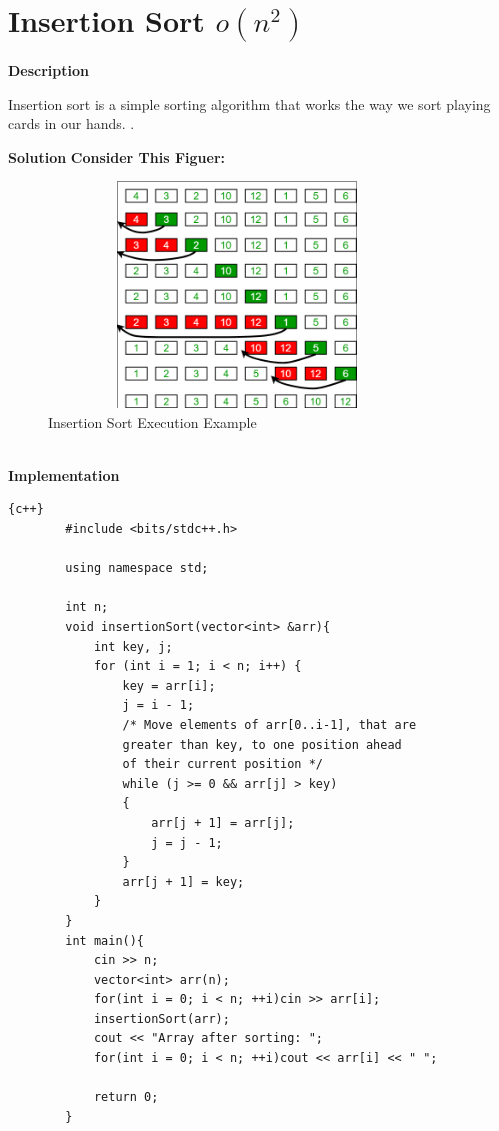 \newpage


\section{Insertion Sort $o(n^2)$}
\textbf{{\Large{Description}}}

Insertion sort is a simple sorting algorithm that works the way we sort playing cards in our hands.
.\newline
    
\textbf{{\Large{Solution}}}\newline\newline
\textbf{{\large{Consider This Figuer:}}}\newline{}
\begin{figure}[h]
    \centering
\includegraphics[width=10cm, height=6cm]{insertion-sort.png}
 \caption{Insertion Sort Execution Example}\footnotemark
    \label{fig:insertion-sort}
\end{figure}
\newline
\\
\newpage
\textbf{{\Large{Implementation}}}

\begin{lstlisting}{c++}
        #include <bits/stdc++.h>
        
        using namespace std;
        
        int n;
        void insertionSort(vector<int> &arr){
        	int key, j;
        	for (int i = 1; i < n; i++) {
        		key = arr[i];
        		j = i - 1;
        		/* Move elements of arr[0..i-1], that are
        		greater than key, to one position ahead
        		of their current position */
        		while (j >= 0 && arr[j] > key)
        		{
        			arr[j + 1] = arr[j];
        			j = j - 1;
        		}
        		arr[j + 1] = key;
        	}
        }
        int main(){
            cin >> n;
        	vector<int> arr(n);
            for(int i = 0; i < n; ++i)cin >> arr[i];
        	insertionSort(arr);
        	cout << "Array after sorting: ";
        	for(int i = 0; i < n; ++i)cout << arr[i] << " ";
        
        	return 0;
        }

\end{lstlisting}
\newpage

